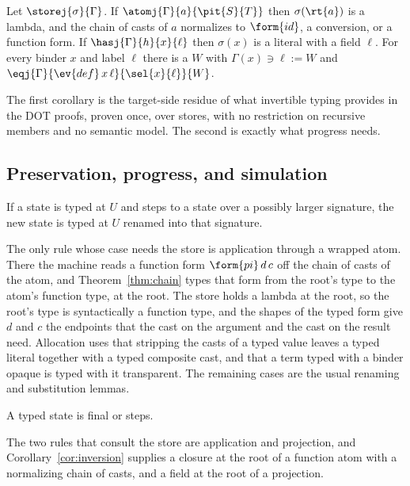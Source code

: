 \begin{corollary}\label{cor:inversion}
Let $\storej{\sigma}{\Gamma}$. If $\atomj{\Gamma}{a}{\pit{S}{T}}$ then $\sigma(\rt{a})$ is a lambda, and the chain of casts of $a$ normalizes to $\form{id}$, a conversion, or a function form. If $\hasj{\Gamma}{h}{x}{\ell}$ then $\sigma(x)$ is a literal with a field $\ell$. For every binder $x$ and label $\ell$ there is a $W$ with $\Gamma(x) \ni \ell \mathrel{:=} W$ and $\eqj{\Gamma}{\ev{def}\,x\,\ell}{\sel{x}{\ell}}{W}$.
\end{corollary}

The first corollary is the target-side residue of what invertible typing provides in the DOT proofs, proven once, over stores, with no restriction on recursive members and no semantic model. The second is exactly what progress needs.

\subsection{Preservation, progress, and simulation}

\begin{theorem}[Preservation]
If a state is typed at $U$ and steps to a state over a possibly larger signature, the new state is typed at $U$ renamed into that signature.
\end{theorem}

The only rule whose case needs the store is application through a wrapped atom. There the machine reads a function form $\form{pi}\,d\,c$ off the chain of casts of the atom, and Theorem~\ref{thm:chain} types that form from the root's type to the atom's function type, at the root. The store holds a lambda at the root, so the root's type is syntactically a function type, and the shapes of the typed form give $d$ and $c$ the endpoints that the cast on the argument and the cast on the result need. Allocation uses that stripping the casts of a typed value leaves a typed literal together with a typed composite cast, and that a term typed with a binder opaque is typed with it transparent. The remaining cases are the usual renaming and substitution lemmas.

\begin{theorem}[Progress]
A typed state is final or steps.
\end{theorem}

The two rules that consult the store are application and projection, and Corollary~\ref{cor:inversion} supplies a closure at the root of a function atom with a normalizing chain of casts, and a field at the root of a projection.

